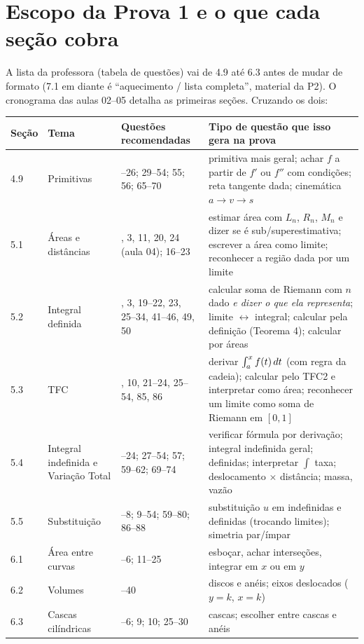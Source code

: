 \section{Escopo da Prova 1 e o que cada seção cobra}

A lista da professora (tabela de questões) vai de 4.9 até 6.3 antes de mudar de formato (7.1 em diante é ``aquecimento / lista completa'', material da P2). O cronograma das aulas 02--05 detalha as primeiras seções. Cruzando os dois:

\begin{center}
\small
\renewcommand{\arraystretch}{1.25}
\begin{tabular}{@{}p{1.0cm}>{\raggedright\arraybackslash}p{2.9cm}>{\raggedright\arraybackslash}p{3.4cm}>{\raggedright\arraybackslash}p{8.3cm}@{}}
\toprule
\textbf{Seção} & \textbf{Tema} & \textbf{Questões recomendadas} & \textbf{Tipo de questão que isso gera na prova}\\
\midrule
4.9 & Primitivas & 1--26; 29--54; 55; 56; 65--70 & primitiva mais geral; achar $f$ a partir de $f'$ ou $f''$ com condições; reta tangente dada; cinemática $a\to v\to s$\\
5.1 & Áreas e distâncias & 2, 3, 11, 20, 24 (aula 04); 16--23 & estimar área com $L_n$, $R_n$, $M_n$ e dizer se é sub/superestimativa; escrever a área como limite; reconhecer a região dada por um limite\\
5.2 & Integral definida & 1, 3, 19--22, 23, 25--34, 41--46, 49, 50 & calcular soma de Riemann com $n$ dado \emph{e dizer o que ela representa}; limite $\leftrightarrow$ integral; calcular pela definição (Teorema 4); calcular por áreas\\
5.3 & TFC & 9, 10, 21--24, 25--54, 85, 86 & derivar $\int_a^{x} f(t)\,dt$ (com regra da cadeia); calcular pelo TFC2 e interpretar como área; reconhecer um limite como soma de Riemann em $[0,1]$\\
5.4 & Integral indefinida e Variação Total & 1--24; 27--54; 57; 59--62; 69--74 & verificar fórmula por derivação; integral indefinida geral; definidas; interpretar $\int$ taxa; deslocamento $\times$ distância; massa, vazão\\
5.5 & Substituição & 1--8; 9--54; 59--80; 86--88 & substituição $u$ em indefinidas e definidas (trocando limites); simetria par/ímpar\\
6.1 & Área entre curvas & 1--6; 11--25 & esboçar, achar interseções, integrar em $x$ ou em $y$\\
6.2 & Volumes & 1--40 & discos e anéis; eixos deslocados ($y=k$, $x=k$)\\
6.3 & Cascas cilíndricas & 2--6; 9; 10; 25--30 & cascas; escolher entre cascas e anéis\\
\bottomrule
\end{tabular}
\end{center}

